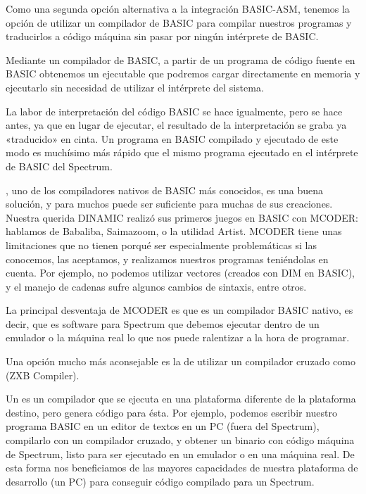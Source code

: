 \documentclass[letterpaper,10pt,spanish]{sphinxmanual}
\begin{document}
Como una segunda opción alternativa a la integración BASIC-ASM, tenemos la opción de utilizar un compilador de BASIC para compilar nuestros programas y traducirlos a código máquina sin pasar por ningún intérprete de BASIC.

Mediante un compilador de BASIC, a partir de un programa de código fuente en BASIC obtenemos un ejecutable que podremos cargar directamente en memoria y ejecutarlo sin necesidad de utilizar el intérprete del sistema.

La labor de interpretación del código BASIC se hace igualmente, pero se hace antes, ya que en lugar de ejecutar, el resultado de la interpretación se graba ya «traducido» en cinta. Un programa en BASIC compilado y ejecutado de este modo es muchísimo más rápido que el mismo programa ejecutado en el intérprete de BASIC del Spectrum.

, uno de los compiladores nativos de BASIC más conocidos, es una buena solución, y para muchos puede ser suficiente para muchas de sus creaciones. Nuestra querida DINAMIC realizó sus primeros juegos en BASIC con MCODER: hablamos de Babaliba, Saimazoom, o la utilidad Artist. MCODER tiene unas limitaciones que no tienen porqué ser especialmente problemáticas si las conocemos, las aceptamos, y realizamos nuestros programas teniéndolas en cuenta. Por ejemplo, no podemos utilizar vectores (creados con DIM en BASIC), y el manejo de cadenas sufre algunos cambios de sintaxis, entre otros.

La principal desventaja de MCODER es que es un compilador BASIC nativo, es decir, que es software para Spectrum que debemos ejecutar dentro de un emulador o la máquina real lo que nos puede ralentizar a la hora de programar.

Una opción mucho más aconsejable es la de utilizar un compilador cruzado como  (ZXB Compiler).

Un  es un compilador que se ejecuta en una plataforma diferente de la plataforma destino, pero genera código para ésta. Por ejemplo, podemos escribir nuestro programa BASIC en un editor de textos en un PC (fuera del Spectrum), compilarlo con un compilador cruzado, y obtener un binario con código máquina de Spectrum, listo para ser ejecutado en un emulador o en una máquina real. De esta forma nos beneficiamos de las mayores capacidades de nuestra plataforma de desarrollo (un PC) para conseguir código compilado para un Spectrum.
\end{document}
